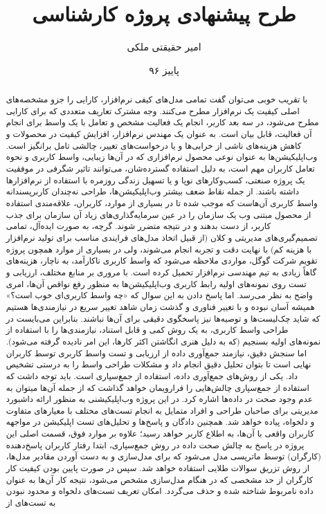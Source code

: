 \documentclass{report}
\title{طرح پیشنهادی پروژه کارشناسی}
\author{امیر حقیقتی ملکی}
\date{پاییز ۹۶}
\theoremstyle{definition}
\begin{document}
	\begin{titlepage}
		
		
	\end{titlepage}
	\newpage
	\begin{abstract}
		\thispagestyle{plain}
	با تقریب خوبی می‌توان گفت تمامی مدل‌های کیفی نرم‌افزار، کارایی را جزو مشخصه‌های اصلی کیفیت یک نرم‌افزار مطرح می‌کنند. وجه مشترک تعاریف متعددی که برای کارایی مطرح می‌شود، در سه بعد کاربر، انجام یک فعالیت مشخص و تعامل با یک واسط برای انجام آن فعالیت، قابل بیان است. به عنوان یک مهندس نرم‌افزار، افزایش کیفیت در محصولات و کاهش هزینه‌های ناشی از خرابی‌ها و یا درخواست‌های تغییر، چالشی تامل برانگیز است. وب‌اپلیکیشن‌ها به عنوان نوعی محصول نرم‌افزاری که در آن‌ها زیبایی، واسط کاربری و نحوه تعامل کاربران مهم است، به دلیل استفاده گسترده‌شان، می‌توانند تاثیر شگرفی در موفقیت یک پروژه صنعتی، کسب‌وکارهای نوپا و یا تسهیل زندگی روزمره با استفاده از نرم‌افزارها داشته باشند. از جمله نقاط ضعف بیشتر وب‌اپلیکیشن‌ها، طراحی نه‌چندان کاربرپسندانه واسط کاربری آن‌هاست که موجب شده تا در بسیاری از موارد، کاربران، علاقه‌مندی استفاده از محصول مبتنی وب یک سازمان را در عین سرمایه‌گذاری‌های زیاد آن سازمان برای جذب کاربر، از دست بدهند و در نتیجه متضرر شوند. گرچه، به صورت ایده‌آل، تمامی تصمیم‌گیری‌های مدیریتی و کلان (از قبیل اتخاذ مدل‌های فرایندی مناسب برای تولید نرم‌افزار با هزینه کم) با نهایت دقت و تجربه انجام می‌شوند، ولی در بسیاری از موارد همچون پروژه تقویم شرکت گوگل، مواردی ملاحظه می‌شود که واسط کاربری ناکارآمد، به ناچار، هزینه‌های گاهاً زیادی به تیم مهندسی نرم‌افزار تحمیل کرده است. با مروری بر منابع مختلف، ارزیابی و تست روی نمونه‌های اولیه رابط کاربری وب‌اپلیکیشن‌ها به منظور رفع نواقص آن‌ها، امری واضح به نظر می‌رسد. اما پاسخ دادن به این سوال که «چه واسط کاربری‌ای خوب است؟» همیشه آسان نبوده و با تغییر فناوری و گذشت زمان شاهد تغییر سریع در نیازمندی‌ها هستیم که شاید چک‌لیست‌ها و توصیه‌ها نیز پاسخگوی دقیقی برای آن‌ها نباشند. بنابراین می‌بایست در طراحی واسط کاربری، به یک روش کمی و قابل استناد، نیازمندی‌ها را با استفاده از نمونه‌های اولیه بسنجیم (که به دلیل هنری انگاشتن اکثر کارها، این امر نادیده گرفته می‌شود). اما سنجش دقیق، نیازمند جمع‌آوری داده از ارزیابی و تست واسط کاربری توسط کاربران نهایی است تا بتوان تحلیل دقیق انجام داد و مشکلات طراحی واسط را به درستی تشخیص داد. یکی از روش‌های جمع‌آوری داده، استفاده از جمع‌سپاری است. باید توجه داشت که استفاده از جمع‌سپاری چالش‌هایی را فرارویمان خواهد گذاشت که از جمله آن‌ها میتوان به عدم وجود صحت در داده‌ها اشاره کرد. در این پروژه وب‌اپلیکیشنی به منظور ارائه داشبورد مدیریتی برای صاحبان طراحی و افراد متمایل به انجام تست‌های مختلف با معیارهای متفاوت و دلخواه، پیاده خواهد شد. همچنین دادگان و پاسخ‌ها و تحلیل‌های تست اپلیکیشن در مواجهه کاربران واقعی با آن‌ها، به اطلاع کاربر خواهد رسید؛ علاوه بر موارد فوق، قسمت اصلی این پروژه در پاسخ به چالش صحت داده در روش جمع‌سپاری، ابتدا رفتار کاربران پاسخ‌دهنده (کارگران) توسط ماتریسی مدل می‌شود که برای مدل‌سازی و به دست آوردن مقادیر مدل‌ها، از روش تزریق سوالات طلایی استفاده خواهد شد. سپس در صورت پایین بودن کیفیت کار کارگران از حد مشخصی که در هنگام مدل‌سازی مشخص می‌شود، نتیجه کار آن‌ها به عنوان داده نامربوط شناخته شده و حذف می‌گردد. امکان تعریف تست‌های دلخواه و محدود نبودن به تست‌های از 
\end{abstract}
\end{document}
